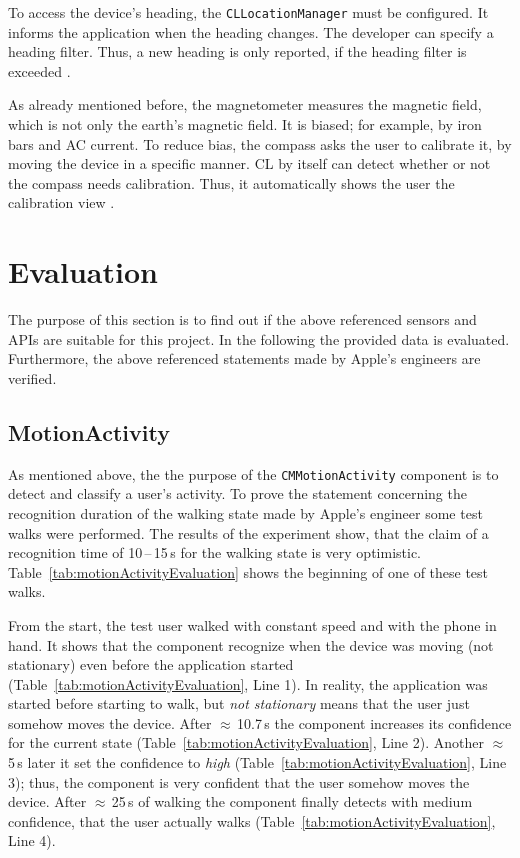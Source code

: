 To access the device's heading, the \texttt{CLLocationManager} must be configured. It informs the application when the heading changes. The developer can specify a heading filter. Thus, a new heading is only reported, if the heading filter is exceeded \citep{apple:ios_doc_cl}.

As already mentioned before, the magnetometer measures the magnetic field, which is not only the earth's magnetic field. It is biased; for example, by iron bars and AC current. To reduce bias, the compass asks the user to calibrate it, by moving the device in a specific manner. \ac{CL} by itself can detect whether or not the compass needs calibration. Thus, it automatically shows the user the calibration view \citep{apple:ios_doc_cl}.


\section{Evaluation}\label{sec:sensor_eval}
The purpose of this section is to find out if the above referenced sensors and \acsp{API} are suitable for this project. In the following the provided data is evaluated. Furthermore, the above referenced statements made by Apple's engineers are verified.


\subsection{MotionActivity}
As mentioned above, the the purpose of the \texttt{CMMotionActivity} component is to detect and classify a user's activity. To prove the statement concerning the recognition duration of the walking state made by Apple's engineer \citet{apple:wwdc_2014_pham} some test walks were performed. The results of the experiment show, that the claim of a recognition time of 10\,--\,15\,s for the walking state is very optimistic. Table~\ref{tab:motionActivityEvaluation} shows the beginning of one of these test walks.

From the start, the test user walked with constant speed and with the phone in hand. It shows that the component recognize when the device was moving (not stationary) even before the application started (Table~\ref{tab:motionActivityEvaluation}, Line 1). In reality, the application was started before starting to walk, but \emph{not stationary} means that the user just somehow moves the device. After $\approx$\,10.7\,s the component increases its confidence for the current state (Table~\ref{tab:motionActivityEvaluation}, Line 2). Another $\approx$5\,s later it set the confidence to \emph{high} (Table~\ref{tab:motionActivityEvaluation}, Line 3); thus, the component is very confident that the user somehow moves the device. After $\approx$\,25\,s of walking the component finally detects with medium confidence, that the user actually walks (Table~\ref{tab:motionActivityEvaluation}, Line 4).

